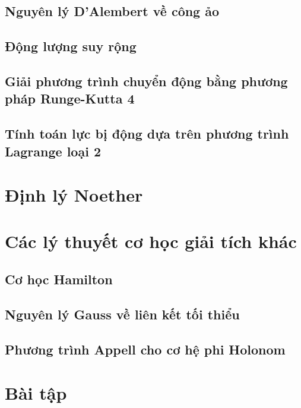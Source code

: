 \subsection{Nguyên lý D'Alembert về công ảo}



\subsection{Động lượng suy rộng}

\subsection{Giải phương trình chuyển động bằng phương pháp Runge-Kutta 4}

\subsection{Tính toán lực bị động dựa trên phương trình Lagrange loại 2}


\section{Định lý Noether}



\section{Các lý thuyết cơ học giải tích khác}

\subsection{Cơ học Hamilton}

\subsection{Nguyên lý Gauss về liên kết tối thiểu}

\subsection{Phương trình Appell cho cơ hệ phi Holonom}


\section{Bài tập}

